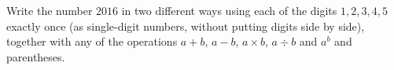 Write the number $2016$ in two different ways using each of the digits $1,2,3,4,5$ exactly once (as single-digit numbers, without putting digits side by side), together with any of the operations $a+b$, $a-b$, $a\times b$, $a\div b$ and $a^b$ and parentheses.
